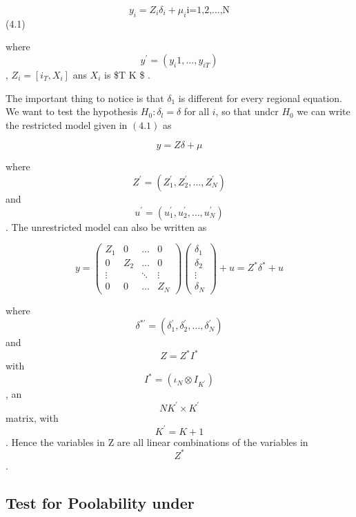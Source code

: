 \documentclass[
]{book}
\begin{document}
\begin{equation}
  y_i=Z_i \delta _i + \mu_i \text{i=1,2,...,N}
\end{equation} (4.1)

where \[ y^{\prime}=(y_i1,...,y_{iT}) \], \(Z_i=[i_T,X_i]\) ans \(X_i\) is \$T \times K \$ .

The important thing to notice is that \(\delta_{1}\) is different for every regional equation. We want to test the hypothesis \(H_{0}: \delta_{l}=\delta\) for all \(i\), so that undcr \(H_{0}\) we can write the restricted model given in \((4.1)\) as

\begin{equation}
y= Z \delta + \mu
\end{equation}

where \[ Z^{\prime}=\left(Z_{1}^{\prime} , Z_{2}^{\prime}, \ldots, Z_{N}^{\prime}\right) \] and \[ u^{\prime}=\left(u_{1}^{\prime}, u_{2}^{\prime}, \ldots, u_{N}^{\prime}\right) \] . The unrestricted model can also be written as

\begin{equation}
y=\left(\begin{array}{cccc}
Z_{1} & 0 & \ldots & 0 \\
0 & Z_{2} & \ldots & 0 \\
\vdots & & \ddots & \vdots \\
0 & 0 & \ldots & Z_{N}
\end{array}\right)\left(\begin{array}{c}
\delta_{1} \\
\delta_{2} \\
\vdots \\
\delta_{N}
\end{array}\right)+u=Z^{*} \delta^{*}+u
\end{equation}

where \[\delta^{* \prime}=\left(\delta_{1}^{\prime}, \delta_{2}^{\prime}, \ldots, \delta_{N}^{\prime}\right)\] and \[ Z=Z^{*} I^{*} \] with \[ I^{*}=\left(\iota_{N} \otimes I_{K^{\prime}}\right)\], an \[ N K^{\prime} \times K^{\prime}\] matrix, with
\[K^{\prime}=K+1 \] . Hence the variables in Z are all linear combinations of the variables in \[ Z^{*}\] .

\hypertarget{test-for-poolability-under}{%
\subsection{Test for Poolability under}\label{test-for-poolability-under}}
\end{document}
